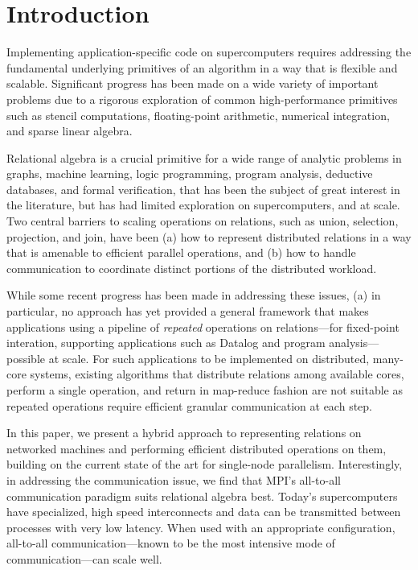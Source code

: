 

\section{Introduction}
\label{sec:intro}
%
Implementing application-specific code on supercomputers requires addressing the fundamental underlying primitives of an algorithm in a way that is flexible and scalable. Significant progress has been made on a wide variety of important problems due to a rigorous exploration of common high-performance primitives such as stencil computations, floating-point arithmetic, numerical integration, and sparse linear algebra. 

Relational algebra is a crucial primitive for a wide range of analytic problems in graphs, machine learning, logic programming, program analysis, deductive databases, and formal verification, that has been the subject of great interest in the literature, but has had limited exploration on supercomputers, and at scale. Two central barriers to scaling operations on relations, such as union, selection, projection, and join, have been (a) how to represent distributed relations in a way that is amenable to efficient parallel operations, and (b) how to handle communication to coordinate distinct portions of the distributed workload.

While some recent progress has been made in addressing these issues, (a) in particular, no approach has yet provided a general framework that makes applications using a pipeline of \emph{repeated} operations on relations---for fixed-point interation, supporting applications such as Datalog and program analysis---possible at scale. For such applications to be implemented on distributed, many-core systems, existing algorithms that distribute relations among available cores, perform a single operation, and return in map-reduce fashion are not suitable as repeated operations require efficient granular communication at each step. 

In this paper, we present a hybrid approach to representing relations on networked machines and performing efficient distributed operations on them, building on the current state of the art for single-node parallelism. Interestingly, in addressing the communication issue, we find that MPI's all-to-all communication paradigm suits relational algebra best. Today's supercomputers have specialized, high speed interconnects and data can be transmitted between processes with very low latency. When used with an appropriate configuration, all-to-all communication---known to be the most intensive mode of communication---can scale well.


